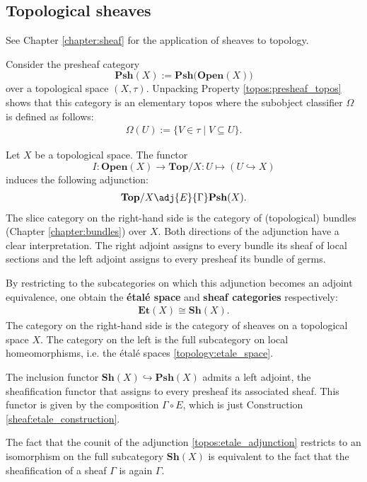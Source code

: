 \subsection{Topological sheaves}

    See Chapter \ref{chapter:sheaf} for the application of sheaves to topology.

    \begin{property}\label{topos:sheaf_topos}
        Consider the presheaf category \[\mathbf{Psh}(X):=\mathbf{Psh(Open}(X))\] over a topological space $(X,\tau)$. Unpacking Property \ref{topos:presheaf_topos} shows that this category is an elementary topos where the subobject classifier $\Omega$ is defined as follows:
        \begin{gather}
            \Omega(U) := \{V\in\tau\mid V\subseteq U\}.
        \end{gather}
    \end{property}

    \begin{construct}\label{topos:etale_adjunction}
        Let $X$ be a topological space. The functor \[I:\mathbf{Open}(X)\rightarrow\mathbf{Top}/X:U\mapsto(U\hookrightarrow X)\] induces the following adjunction:
        \begin{gather}
            \mathbf{Top}/X\adj{E}{\Gamma}\mathbf{Psh}(X).
        \end{gather}
        The slice category on the right-hand side is the category of (topological) bundles (Chapter \ref{chapter:bundles}) over $X$. Both directions of the adjunction have a clear interpretation. The right adjoint assigns to every bundle its sheaf of local sections and the left adjoint assigns to every presheaf its bundle of germs.

        By restricting to the subcategories on which this adjunction becomes an adjoint equivalence, one obtain the \textbf{\'etal\'e space} and \textbf{sheaf categories} respectively:
        \begin{gather}
            \mathbf{Et}(X)\cong\mathbf{Sh}(X).
        \end{gather}
        The category on the right-hand side is the category of sheaves on a topological space $X$. The category on the left is the full subcategory on local homeomorphisms, i.e. the \'etal\'e spaces \ref{topology:etale_space}.
    \end{construct}

    \begin{property}
        The inclusion functor $\mathbf{Sh}(X)\hookrightarrow\mathbf{Psh}(X)$ admits a left adjoint, the sheafification functor that assigns to every presheaf its associated sheaf. This functor is given by the composition $\Gamma\circ E$, which is just Construction \ref{sheaf:etale_construction}.

        The fact that the counit of the adjunction \ref{topos:etale_adjunction} restricts to an isomorphism on the full subcategory $\mathbf{Sh}(X)$ is equivalent to the fact that the sheafification of a sheaf $\Gamma$ is again $\Gamma$.
    \end{property}

